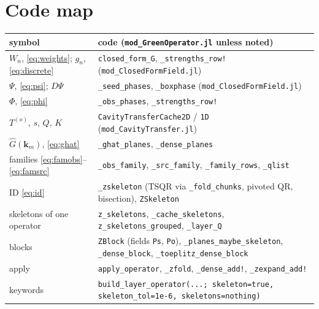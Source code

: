 \documentclass[11pt,a4paper]{article}
\newcommand{\code}[1]{\texttt{#1}}
\newcommand{\km}{\mathbf{k}_m}
\newcommand{\Ghat}{\widehat{G}}
\theoremstyle{remark}
\begin{document}
\section{Code map}
\begin{center}
\small
\begin{tabular}{>{\raggedright\arraybackslash}p{6.2cm}>{\raggedright\arraybackslash}p{8.3cm}}
\toprule
symbol & code (\code{mod\_GreenOperator.jl} unless noted) \\
\midrule
$W_n$, \eqref{eq:weights}; $g_n$, \eqref{eq:discrete} & \code{closed\_form\_G}, \code{\_strengths\_row!} (\code{mod\_ClosedFormField.jl}) \\
$\Psi$, \eqref{eq:psi}; $D\Psi$ & \code{\_seed\_phases}, \code{\_boxphase} (\code{mod\_ClosedFormField.jl}) \\
$\Phi$, \eqref{eq:phi} & \code{\_obs\_phases}, \code{\_strengths\_row!} \\
$T^{(o)}$, $s$, $Q$, $K$ & \code{CavityTransferCache2D} / \code{1D} (\code{mod\_CavityTransfer.jl}) \\
$\Ghat(\km)$, \eqref{eq:ghat} & \code{\_ghat\_planes}, \code{\_dense\_planes} \\
families \eqref{eq:famobs}--\eqref{eq:famsrc} & \code{\_obs\_family}, \code{\_src\_family}, \code{\_family\_rows}, \code{\_qlist} \\
ID \eqref{eq:id} & \code{\_zskeleton} (TSQR via \code{\_fold\_chunks}, pivoted QR, bisection), \code{ZSkeleton} \\
skeletons of one operator & \code{z\_skeletons}, \code{\_cache\_skeletons}, \code{z\_skeletons\_grouped}, \code{\_layer\_Q} \\
blocks & \code{ZBlock} (fields \code{Ps}, \code{Po}), \code{\_planes\_maybe\_skeleton}, \code{\_dense\_block}, \code{\_toeplitz\_dense\_block} \\
apply & \code{apply\_operator}, \code{\_zfold}, \code{\_dense\_add!}, \code{\_zexpand\_add!} \\
keywords & \code{build\_layer\_operator(...; skeleton=true, skeleton\_tol=1e-6, skeletons=nothing)} \\
\bottomrule
\end{tabular}
\end{center}
\end{document}

